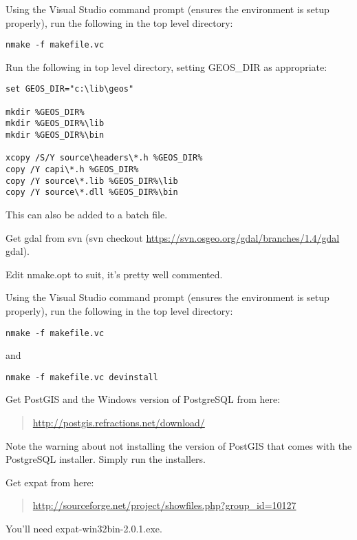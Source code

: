 Using the Visual Studio command prompt (ensures the environment is setup properly), run the following in the top level directory:

\begin{verbatim}
nmake -f makefile.vc 
\end{verbatim}

Run the following in top level directory, setting GEOS\_DIR as appropriate:

\begin{verbatim}
set GEOS_DIR="c:\lib\geos"

mkdir %GEOS_DIR%
mkdir %GEOS_DIR%\lib
mkdir %GEOS_DIR%\bin

xcopy /S/Y source\headers\*.h %GEOS_DIR%
copy /Y capi\*.h %GEOS_DIR%
copy /Y source\*.lib %GEOS_DIR%\lib
copy /Y source\*.dll %GEOS_DIR%\bin
\end{verbatim}

This can also be added to a batch file.

\hypertarget{toc86}{}
Get gdal from svn (svn checkout \url{https://svn.osgeo.org/gdal/branches/1.4/gdal} gdal).

Edit nmake.opt to suit, it's pretty well commented.

Using the Visual Studio command prompt (ensures the environment is setup properly), run the following in the top level directory:

\begin{verbatim}
nmake -f makefile.vc 
\end{verbatim}

and

\begin{verbatim}
nmake -f makefile.vc devinstall 
\end{verbatim}

\hypertarget{toc87}{}
Get PostGIS and the Windows version of PostgreSQL from here:

	\begin{quotation}
\url{http://postgis.refractions.net/download/}
	\end{quotation}
Note the warning about not installing the version of PostGIS that comes with the PostgreSQL installer. Simply run the installers.

\hypertarget{toc88}{}
Get expat from here:

	\begin{quotation}
\url{http://sourceforge.net/project/showfiles.php?group\_id=10127}
	\end{quotation}
You'll need expat-win32bin-2.0.1.exe.

